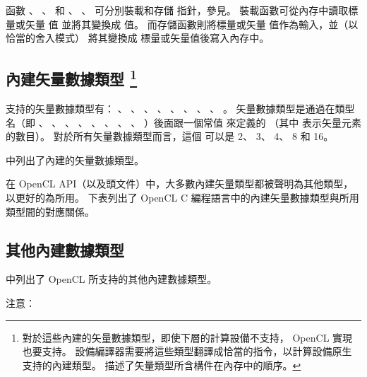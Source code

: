 函數 、 、 
 和 、 、 
 可分別裝載和存儲  指針，參見。
裝載函數可從內存中讀取標量或矢量  值 並將其變換成  值。
而存儲函數則將標量或矢量  值作為輸入，並（以恰當的舍入模式）
將其變換成  標量或矢量值後寫入內存中。


\subsection[sec:bivdt]{內建矢量數據類型
\footnote{對於這些內建的矢量數據類型，即使下層的計算設備不支持， OpenCL 實現也要支持。
設備編譯器需要將這些類型翻譯成恰當的指令，以計算設備原生支持的內建類型。
 描述了矢量類型所含構件在內存中的順序。}}

支持的矢量數據類型有： 、 、 、
 、 、 、
 、 、 。
矢量數據類型是通過在類型名（即 、 、 、
 、 、 、 、 、
 ）後面跟一個常值  來定義的
（其中  表示矢量元素的數目）。
對於所有矢量數據類型而言，這個  可以是 2、 3、 4、 8 和 16。

中列出了內建的矢量數據類型。

{}

在 OpenCL API（以及頭文件）中，大多數內建矢量類型都被聲明為其他類型，
以更好的為所用。
下表列出了 OpenCL C 編程語言中的內建矢量數據類型與所用類型間的對應關係。



\subsection[sec:obidt]{其他內建數據類型}

中列出了 OpenCL 所支持的其他內建數據類型。

{}

注意：

